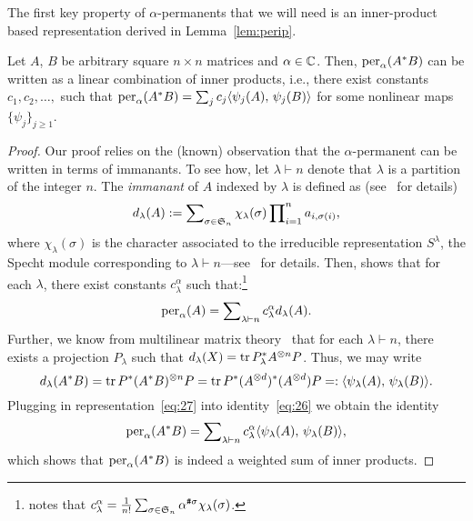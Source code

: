 \documentclass[11pt]{article}
\begin{document}
The first key property of $\alpha$-permanents that we will need is an inner-product based representation derived in Lemma~\ref{lem:perip}.
\begin{lemma}
  \label{lem:perip}
  Let $A$, $B$ be arbitrary square $n\times n$ matrices and $\alpha \in \mathbb{C}$. Then, $\operatorname{per}_\alpha(A^*B)$ can be written as a linear combination of inner products, i.e., there exist constants $c_1,c_2,\ldots,$ such that $\operatorname{per}_\alpha(A^*B) = \sum_j c_j\langle {\psi_j(A)},\, {\psi_j(B)} \rangle$ for some nonlinear maps $\{\psi_j\}_{j \ge 1}$.
\end{lemma}
\begin{proof}
  Our proof relies on the (known) observation that the $\alpha$-permanent can be written in terms of immanants. To see how, let $\lambda \vdash n$ denote that $\lambda$ is a partition of the integer $n$. The \emph{immanant} of $A$ indexed by $\lambda$ is defined as (see~\citep{merris1997} for details)
  \begin{equation}
    \label{eq:25}
    d_\lambda(A) := \sum\nolimits_{\sigma \in \mathfrak{S}_n} \chi_\lambda(\sigma) \prod\nolimits_{i=1}^n a_{i,\sigma(i)},
  \end{equation}
  where $\chi_\lambda(\sigma)$ is the character associated to the irreducible representation $S^\lambda$, the Specht module corresponding to $\lambda \vdash n$---see~\citep{fulton2013} for details. Then, \citet[Eq.~(12)]{crane2013} shows that for each $\lambda$, there exist constants $c_\lambda^\alpha$ such that:\footnote{\citep[Theorem~2.4]{crane2013} notes that $c_\lambda^\alpha = \frac{1}{n!}\sum_{\sigma \in \mathfrak{S}_n} \alpha^{\texttt{\#}\sigma}\chi_\lambda(\sigma)$.}
  \begin{equation}
    \label{eq:26}
  \operatorname{per}_\alpha(A) = \sum\nolimits_{\lambda \vdash n} c_\lambda^\alpha d_\lambda(A).
  \end{equation}
  Further, we know from multilinear matrix theory~\citep{merris1997} that for each $\lambda \vdash n$, there exists a projection $P_\lambda$ such that $d_\lambda(X)=\operatorname{tr} P_\lambda^* A^{\otimes n}P$. Thus, we may write
  \begin{equation}
    \label{eq:27}
    d_\lambda(A^*B) = \operatorname{tr} P^*(A^*B)^{\otimes n}P = \operatorname{tr} P^*(A^{\otimes d})^*(A^{\otimes d})P =: \langle {\psi_\lambda(A)},\, {\psi_\lambda(B)} \rangle.
  \end{equation}
  Plugging in representation~\eqref{eq:27} into identity~\eqref{eq:26} we obtain the identity
  \begin{align*}
    \operatorname{per}_\alpha(A^*B) = \sum\nolimits_{\lambda \vdash n} c_\lambda^\alpha \langle {\psi_\lambda(A)},\, {\psi_\lambda(B)} \rangle,
  \end{align*}
  which shows that $\operatorname{per}_\alpha(A^*B)$ is indeed a weighted sum of inner products.
\end{proof}
\end{document}

